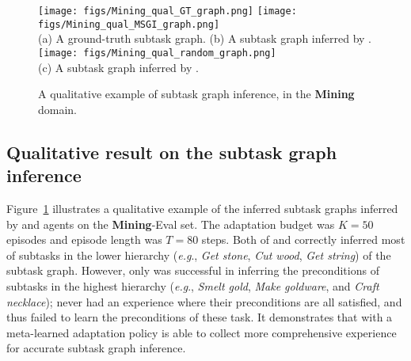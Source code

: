 \documentclass{article} \usepackage{iclr2020_conference,times}
\makeatletter
\newcommand{\tb}{\textbf}
\DeclareRobustCommand\onedot{\futurelet\@let@token\@onedot}
\def\onedot{.}
\def\eg{\emph{e.g}\onedot} \def\Eg{\emph{E.g}\onedot}
\makeatother
\begin{document}
\begin{figure}[!p]
    \centering
    \texttt{[image: figs/Mining\_qual\_GT\_graph.png]}
    \hfill
    \texttt{[image: figs/Mining\_qual\_MSGI\_graph.png]}
    \\[10pt]
    \hfill (a) A ground-truth subtask graph.      \hfill
    (b) A subtask graph inferred by \NSGIMeta.    \hfill
    \\[15pt]
    \texttt{[image: figs/Mining\_qual\_random\_graph.png]}
    \\[10pt]
    (c) A subtask graph inferred by \NSGIRND.
    \vspace*{15pt}
    \caption{A qualitative example of subtask graph inference, in the \tb{Mining} domain. 
    }
    \label{fig:qualitative-result}
    \vspace{-10pt}
\end{figure}

\subsection{Qualitative result on the subtask graph inference} 
\label{sec:appendix_mining_graph_qualitative}
Figure~\ref{fig:qualitative-result} illustrates a qualitative example
of the inferred subtask graphs inferred by \NSGIMeta and \NSGIRND agents on the \tb{Mining}-Eval set.
The adaptation budget was $K=50$ episodes and episode length was $T=80$ steps.
Both of \NSGIMeta and \NSGIRND correctly inferred
most of subtasks in the lower hierarchy (\eg, \textit{Get stone}, \textit{Cut wood}, \textit{Get string}) of the subtask graph.
However, only \NSGIMeta was successful in inferring the preconditions of
subtasks in the highest hierarchy (\eg, \textit{Smelt gold}, \textit{Make goldware}, and \textit{Craft necklace});
\NSGIRND never had an experience where their preconditions are all satisfied, and thus failed to learn the preconditions of these task.
It demonstrates that \NSGIMeta with a meta-learned adaptation policy
is able to collect more comprehensive experience for accurate subtask graph inference.
\end{document}
